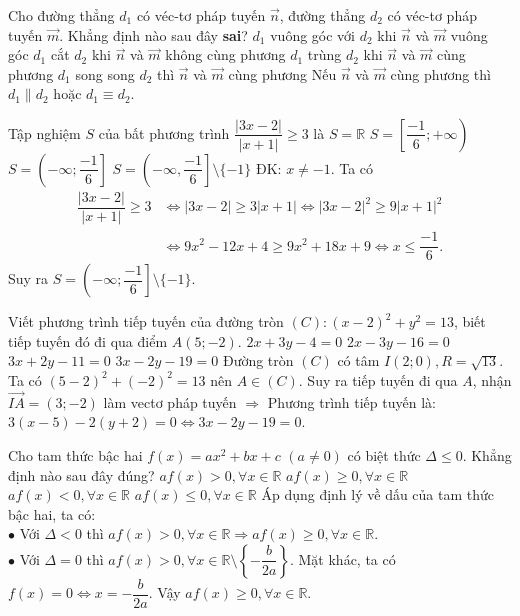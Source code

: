 \begin{ex}%
  Cho đường thẳng $d_1$ có véc-tơ pháp tuyến $\vec{n}$, đường thẳng $d_2$ có véc-tơ pháp tuyến $\vec{m}$. Khẳng định nào sau đây \textbf{sai}?
  \choice
  {$d_1$ vuông góc với $d_2$ khi $\vec{n}$ và $\vec{m}$ vuông góc}
  {$d_1$ cắt $d_2$ khi $\vec{n}$ và $\vec{m}$ không cùng phương}
  {\True $d_1$ trùng $d_2$ khi $\vec{n}$ và $\vec{m}$ cùng phương}
  {$d_1$ song song $d_2$ thì $\vec{n}$ và $\vec{m}$ cùng phương}
\loigiai
    {
Nếu $\vec{n}$ và $\vec{m}$ cùng phương thì $d_1\parallel d_2$ hoặc $d_1\equiv d_2$.
    }
\end{ex}
\begin{ex}%
	Tập nghiệm $S$ của bất phương trình $\dfrac{|3x-2|}{|x+1|}\geq 3$ là
	\choice
	{$S=\mathbb{R}$}
	{$S=\left[\dfrac{-1}{6}; +\infty \right)$ }
	{$S=\left(-\infty; \dfrac{-1}{6} \right]$}
	{\True $S=\left(-\infty,\dfrac{-1}{6} \right]\setminus \{-1\}$}
	\loigiai
	{ĐK: $x\neq -1$. Ta có
$$\begin{aligned}\dfrac{|3x-2|}{|x+1|}\geq 3&\Leftrightarrow |3x-2|\geq 3|x+1|\Leftrightarrow|3x-2|^2\geq 9|x+1|^2\\
&\Leftrightarrow 9x^2-12x+4\geq 9x^2+18x+9\Leftrightarrow x\leq \dfrac{-1}{6}.
\end{aligned}$$
Suy ra $S=\left(-\infty; \dfrac{-1}{6} \right]\setminus \{-1\}$.	
	}
\end{ex}
\begin{ex}%
	Viết phương trình tiếp tuyến của  đường tròn $(C): (x-2)^2+y^2=13$, biết tiếp tuyến đó đi qua điểm $A(5;-2)$.
	\choice
	{$2x+3y-4=0$}
	{$2x-3y-16=0$ }
	{$3x+2y-11=0$}
	{\True $3x-2y-19=0$}
	\loigiai
	{Đường tròn $(C)$ có tâm $I(2;0),R=\sqrt{13}$. Ta có $(5-2)^2+(-2)^2=13$ nên $A\in (C)$.
	Suy ra tiếp tuyến đi qua $A$, nhận $\vec{IA}=(3;-2)$ làm vectơ pháp tuyến
	$\Rightarrow$ Phương trình tiếp tuyến là: $3(x-5)-2(y+2)=0\Leftrightarrow 3x-2y-19=0$.	
	}
\end{ex}
\begin{ex}%
	Cho tam thức bậc hai $f(x)=ax^2+bx+c$ $(a\neq 0)$ có biệt thức $\Delta\leq 0$. Khẳng định nào sau đây đúng?
	\choice
	{$af(x)>0, \forall x\in\mathbb{R}$}
	{\True $af(x)\geq 0, \forall x\in\mathbb{R}$}
	{$af(x)<0, \forall x\in\mathbb{R}$}
	{$af(x)\leq 0, \forall x\in\mathbb{R}$}
	\loigiai
{
Áp dụng định lý về dấu của tam thức bậc hai, ta có:\\
$\bullet$ Với $\Delta<0$ thì $af(x)>0, \forall x\in\mathbb{R}\Rightarrow af(x)\geq 0, \forall x\in\mathbb{R}$.\\
$\bullet$ Với $\Delta=0$ thì $af(x)>0, \forall x\in\mathbb{R}\setminus\left\{-\dfrac{b}{2a}\right\}$. Mặt khác, ta có $f(x)=0\Leftrightarrow x=-\dfrac{b}{2a}$. Vậy $af(x)\geq 0, \forall x\in\mathbb{R}$.
}
\end{ex}
